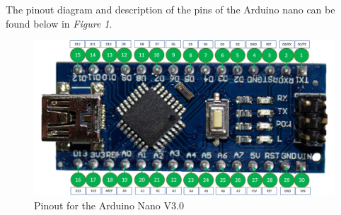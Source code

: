 \documentclass[12pt]{article}
\begin{document}
The pinout diagram and description of the pins of the Arduino nano can be found below in \textit{Figure 1}.

\begin{figure}[H]
    \centering
    \includegraphics[width=14cm]{photos/lab/nanopinout.png}
    \caption{Pinout for the Arduino Nano V3.0}
\end{figure}
\end{document}
